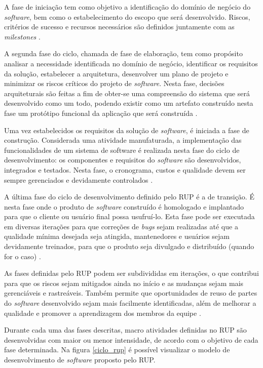 A fase de iniciação tem como objetivo a identificação do domínio de negócio do \textit{software}, bem como o estabelecimento do escopo que será desenvolvido. Riscos, critérios de sucesso e recursos necessários são definidos juntamente com as \textit{milestones} \cite{rational_software_rational_1998}.

A segunda fase do ciclo, chamada de fase de elaboração, tem como propósito analisar a necessidade identificada no domínio de negócio, identificar os requisitos da solução, estabelecer a arquitetura, desenvolver um plano de projeto e minimizar os riscos críticos do projeto de \textit{software}. Nesta fase, decisões arquiteturais são feitas a fim de obter-se uma compreensão do sistema que será desenvolvido como um todo, podendo existir como um artefato construído nesta fase um protótipo funcional da aplicação que será construída \cite{rational_software_rational_1998}.

Uma vez estabelecidos os requisitos da solução de \textit{software}, é iniciada a fase de construção. Considerada uma atividade manufaturada, a implementação das funcionalidades de um sistema de software é realizada nesta fase do ciclo de desenvolvimento: os componentes e requisitos do \textit{software} são desenvolvidos, integrados e testados. Nesta fase, o cronograma, custos e qualidade devem ser sempre gerenciados e devidamente controlados \cite{rational_software_rational_1998}.

A última fase do ciclo de desenvolvimento definido pelo RUP é a de transição. É nesta fase onde o produto de \textit{software} construído é homologado e implantado para que o cliente ou usuário final possa usufruí-lo. Esta fase pode ser executada em diversas iterações para que correções de \textit{bugs} sejam realizadas até que a qualidade mínima desejada seja atingida, mantenedores e usuários sejam devidamente treinados, para que o produto seja divulgado e distribuído (quando for o caso) \cite{rational_software_rational_1998}.

As fases definidas pelo RUP podem ser subdivididas em iterações, o que contribui para que os riscos sejam mitigados ainda no início e as mudanças sejam mais gerenciáveis e rastreáveis. Também permite que oportunidades de reuso de partes do \textit{software} desenvolvido sejam mais facilmente identificadas, além de melhorar a qualidade e promover a aprendizagem dos membros da equipe \cite{rational_software_rational_1998}.

Durante cada uma das fases descritas, macro atividades definidas no RUP são desenvolvidas com maior ou menor intensidade, de acordo com o objetivo de cada fase determinada. Na figura \ref{ciclo_rup} é possível visualizar o modelo de desenvolvimento de \textit{software} proposto pelo RUP.


